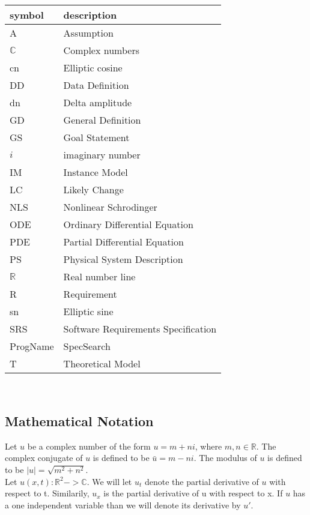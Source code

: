 \documentclass[12pt]{article}
\newcommand{\progname}{ProgName} %
\begin{document}
\renewcommand{\arraystretch}{1.2}
\begin{tabular}{l l} 
  \toprule		
  \textbf{symbol} & \textbf{description}\\
  \midrule 
  A & Assumption\\
  $\mathbb{C}$ & Complex numbers\\
  cn & Elliptic cosine \\
  DD & Data Definition\\
  dn & Delta amplitude \\
  GD & General Definition\\
  GS & Goal Statement\\
  $i$ & imaginary number\\
  IM & Instance Model\\
  LC & Likely Change\\
  NLS & Nonlinear Schrodinger\\
  ODE & Ordinary Differential Equation\\
  PDE & Partial Differential Equation\\
  PS & Physical System Description\\
  $\mathbb{R}$ & Real number line\\
  R & Requirement\\ 
  sn & Elliptic sine\\
  SRS & Software Requirements Specification\\
  \progname{} & SpecSearch\\
  T & Theoretical Model\\  
  \bottomrule
\end{tabular}\\

\subsection{Mathematical Notation}
Let $u$ be a complex number of the form $u= m + ni$, where $m,n \in 
\mathbb{R}$. The complex conjugate of $u$ is defined to be $\bar{u}= m - ni$. 
The modulus of $u$ is defined to be $|u| = \sqrt{m^{2}+n^{2}}$. \\

Let $u(x,t): \mathbb{R}^{2} -> \mathbb{C}$. We will let $u_{t}$ denote the 
partial derivative of $u$ with respect to t. Similarily, $u_{x}$ is the partial 
derivative of u with respect to x. If $u$ has a one independent variable than 
we will denote its derivative by $u'$. \\

\end{document}
